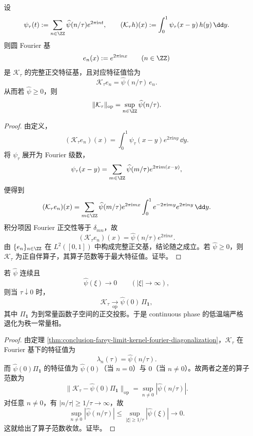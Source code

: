 \begin{theorem}\label{thm:conclusion-farey-limit-kernel-fourier-diagonalization}
设
\[
\psi_\tau(t):=\sum_{n\in\ZZ}\widehat\psi(n/\tau)e^{2\pi\mathrm{i}nt},
\qquad
(\mathcal K_\tau h)(x):=\int_0^1 \psi_\tau(x-y)\,h(y)\,\dd y.
\]
则圆 Fourier 基
\[
e_n(x):=e^{2\pi\mathrm{i}n x}
\qquad (n\in\ZZ)
\]
是 \(\mathcal K_\tau\) 的完整正交特征基，且对应特征值恰为
\[
\mathcal K_\tau e_n=\widehat\psi(n/\tau)\,e_n.
\]
从而若 \(\widehat\psi\ge 0\)，则
\[
\|\mathcal K_\tau\|_{\mathrm{op}}
=
\sup_{n\in\ZZ}\widehat\psi(n/\tau).
\]
\end{theorem}
\begin{proof}
由定义，
\[
(\mathcal K_\tau e_n)(x)
=
\int_0^1\psi_\tau(x-y)e^{2\pi\mathrm{i}ny}\,\dd y.
\]
将 \(\psi_\tau\) 展开为 Fourier 级数，
\[
\psi_\tau(x-y)
=
\sum_{m\in\ZZ}\widehat\psi(m/\tau)e^{2\pi\mathrm{i}m(x-y)},
\]
便得到
\[
(\mathcal K_\tau e_n)(x)
=
\sum_{m\in\ZZ}\widehat\psi(m/\tau)e^{2\pi\mathrm{i}mx}
\int_0^1 e^{-2\pi\mathrm{i}my}e^{2\pi\mathrm{i}ny}\,\dd y.
\]
积分项因 Fourier 正交性等于 \(\delta_{mn}\)，故
\[
(\mathcal K_\tau e_n)(x)=\widehat\psi(n/\tau)e^{2\pi\mathrm{i}nx}.
\]
由 \(\{e_n\}_{n\in\ZZ}\) 在 \(L^2([0,1])\) 中构成完整正交基，结论随之成立。若 \(\widehat\psi\ge 0\)，则 \(\mathcal K_\tau\) 为正自伴算子，其算子范数等于最大特征值。证毕。
\end{proof}

\begin{corollary}\label{cor:conclusion-farey-lowtemperature-rankone-constant-collapse}
若 \(\widehat\psi\) 连续且
\[
\widehat\psi(\xi)\to 0
\qquad (|\xi|\to\infty),
\]
则当 \(\tau\downarrow 0\) 时，
\[
\mathcal K_\tau\xrightarrow[\mathrm{op}]{}\widehat\psi(0)\,\Pi_{\mathbf 1},
\]
其中 \(\Pi_{\mathbf 1}\) 为到常量函数子空间的正交投影。于是 continuous phase 的低温端严格退化为秩一常量相。
\end{corollary}
\begin{proof}
由定理 \ref{thm:conclusion-farey-limit-kernel-fourier-diagonalization}，\(\mathcal K_\tau\) 在 Fourier 基下的特征值为
\[
\lambda_n(\tau)=\widehat\psi(n/\tau).
\]
而 \(\widehat\psi(0)\Pi_{\mathbf 1}\) 的特征值为 \(\widehat\psi(0)\)（当 \(n=0\)）与 \(0\)（当 \(n\neq 0\)）。故两者之差的算子范数为
\[
\|\mathcal K_\tau-\widehat\psi(0)\Pi_{\mathbf 1}\|_{\mathrm{op}}
=
\sup_{n\neq 0}|\widehat\psi(n/\tau)|.
\]
对任意 \(n\neq 0\)，有 \(|n/\tau|\ge 1/\tau\to\infty\)，故
\[
\sup_{n\neq 0}|\widehat\psi(n/\tau)|
\le
\sup_{|\xi|\ge 1/\tau}|\widehat\psi(\xi)|
\longrightarrow 0.
\]
这就给出了算子范数收敛。证毕。
\end{proof}

